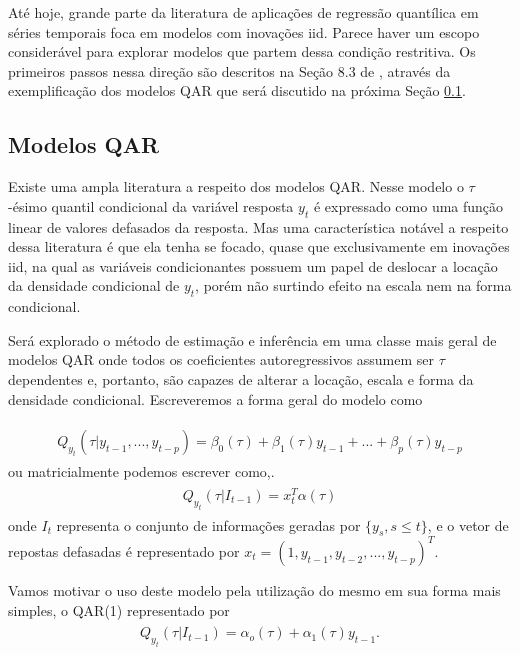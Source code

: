 \documentclass[paper=a4, fontsize=11pt]{scrartcl}
\numberwithin{equation}{section}		%
\numberwithin{figure}{section}			%
\numberwithin{table}{section}				%
\begin{document}
Até hoje, grande parte da literatura de aplicações de regressão quantílica em séries temporais foca em modelos com inovações iid. Parece haver um escopo considerável para explorar modelos que partem dessa condição restritiva. Os primeiros passos nessa direção são descritos na Seção 8.3 de \cite{koenker2005quantile}, através da exemplificação dos modelos QAR que será discutido na próxima Seção \ref{QAR}.

\subsection{Modelos QAR}\label{QAR}
Existe uma ampla literatura a respeito dos modelos QAR. Nesse modelo o $\tau$-ésimo quantil condicional da variável resposta $y_{t}$ é expressado como uma função linear de valores defasados da resposta. Mas uma característica notável a respeito dessa literatura é que ela tenha se focado, quase que exclusivamente em inovações iid, na qual as variáveis condicionantes possuem um papel de deslocar a locação da densidade condicional de $y_{t}$, porém não surtindo efeito na escala nem na forma condicional.

Será explorado o método de estimação e inferência em uma classe mais geral de modelos QAR onde todos os coeficientes autoregressivos assumem ser $\tau$ dependentes e, portanto, são capazes de alterar a locação, escala e forma da densidade condicional. Escreveremos a forma geral do modelo como

\vspace{-10pt}
\begin{align} 
	\begin{split}
	Q_{y_{t}}(\tau|y_{t-1}, ..., y_{t-p}) = \beta_{0}(\tau) + \beta_{1}(\tau)y_{t-1} + ... + \beta_{p}(\tau)y_{t-p} \label{eq:QAR}
	\end{split}					
\end{align}
{\parindent0pt ou matricialmente podemos escrever como,.}
\vspace{-10pt}
\begin{align} 
	\begin{split}
	Q_{y_{t}}(\tau|I_{t-1}) = x_{t}^{T}\alpha(\tau) \label{eq:QAR_matr}
	\end{split}					
\end{align}
{\parindent0pt onde $I_{t}$ representa o conjunto de informações geradas por $\{y_{s},s\leq t\}$, e o vetor de repostas defasadas é representado por $x_t=(1,y_{t-1},y_{t-2},...,y_{t-p})^T$.}

Vamos motivar o uso deste modelo pela utilização do mesmo em sua forma mais simples, o QAR(1) representado por
\begin{align} 
	\begin{split}
	Q_{y_{t}}(\tau|I_{t-1}) = \alpha_{o}(\tau)+\alpha_{1}(\tau)y_{t-1}. \label{eq:QAR_1}
	\end{split}					
\end{align}
\end{document}
